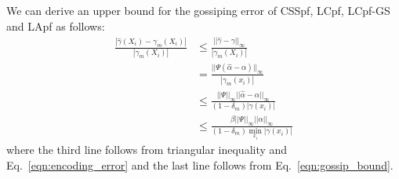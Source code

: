 \documentclass[10pt,letterpaper,final]{article}
\begin{document}


We can derive an upper bound for the gossiping error of CSSpf, LCpf, LCpf-GS and LApf as follows: 
\begin{align}
\frac{|\hat{\gamma}(X_i)-\gamma_m(X_i)|}{|\gamma_m(X_i)|} &\leq  \frac{||\hat{\gamma}-\gamma ||_\infty}{|\gamma_m(X_i)|} \nonumber \\
&= \frac{||\Psi (\hat{\alpha}-\alpha) ||_\infty}{|\gamma_m(x_i)|} \nonumber \\
&\leq \frac{||\Psi||_\infty ||\hat{\alpha}-\alpha ||_\infty}{(1-\delta_m)|\gamma(x_i)|} \nonumber \\
&\leq \frac{\beta ||\Psi||_\infty ||\alpha ||_\infty}{(1-\delta_m)\min_{x_i}|\gamma(x_i)|} 
\label{eqn:gossiping_error2}
\end{align}
where the third line follows from triangular inequality and Eq.~\eqref{eqn:encoding_error} and the last line follows from Eq.~\eqref{eqn:gossip_bound}. 
\end{document}
